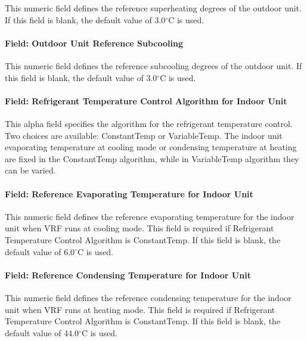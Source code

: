 This numeric field defines the reference superheating degrees of the outdoor unit. If this field is blank, the default value of 3.0$^\circ$C is used.

\paragraph{Field: Outdoor Unit Reference Subcooling}\label{field-outdoor-unit-reference-subcooling}

This numeric field defines the reference subcooling degrees of the outdoor unit. If this field is blank, the default value of 3.0$^\circ$C is used.

\paragraph{Field: Refrigerant Temperature Control Algorithm for Indoor Unit}\label{field-refrigerant-temperature-control-algorithm-for-indoor-unit}

This alpha field specifies the algorithm for the refrigerant temperature control. Two choices are available: ConstantTemp or VariableTemp. The indoor unit evaporating temperature at cooling mode or condensing temperature at heating are fixed in the ConstantTemp algorithm, while in VariableTemp algorithm they can be varied.

\paragraph{Field: Reference Evaporating Temperature for Indoor Unit}\label{field-reference-evaporating-temperature-for-indoor-unit}

This numeric field defines the reference evaporating temperature for the indoor unit when VRF runs at cooling mode. This field is required if Refrigerant Temperature Control Algorithm is ConstantTemp. If this field is blank, the default value of 6.0$^\circ$C is used.

\paragraph{Field: Reference Condensing Temperature for Indoor Unit}\label{field-reference-condensing-temperature-for-indoor-unit}

This numeric field defines the reference condensing temperature for the indoor unit when VRF runs at heating mode. This field is required if Refrigerant Temperature Control Algorithm is ConstantTemp. If this field is blank, the default value of 44.0$^\circ$C is used.

